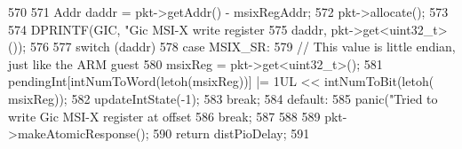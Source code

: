\begin{DoxyCode}
570 {
571     Addr daddr = pkt->getAddr() - msixRegAddr;
572     pkt->allocate();
573 
574     DPRINTF(GIC, "Gic MSI-X write register %
575                  daddr, pkt->get<uint32_t>());
576 
577     switch (daddr) {
578         case MSIX_SR:
579             // This value is little endian, just like the ARM guest
580             msixReg = pkt->get<uint32_t>();
581             pendingInt[intNumToWord(letoh(msixReg))] |= 1UL << intNumToBit(letoh(
      msixReg));
582             updateIntState(-1);
583             break;
584         default:
585             panic("Tried to write Gic MSI-X register at offset %
586             break;
587     }
588 
589     pkt->makeAtomicResponse();
590     return distPioDelay;
591 }
\end{DoxyCode}


